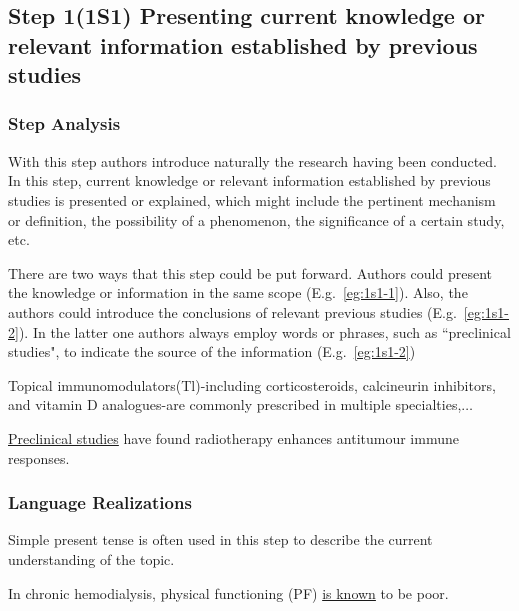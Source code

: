 \documentclass{ctexbook}
\begin{document}
  \subsection{Step 1(1S1) Presenting current knowledge or relevant information established by previous studies}

    \subsubsection{Step Analysis}

    With this step authors introduce naturally the research having been conducted. In this step, current knowledge or relevant information established by previous studies is presented or explained, which might include the pertinent mechanism or definition, the possibility of a phenomenon, the significance of a certain study, etc.
    
    There are two ways that this step could be put forward. Authors could present the knowledge or information in the same scope (E.g.~\ref{eg:1s1-1}). Also, the authors could introduce the conclusions of relevant previous studies (E.g.~\ref{eg:1s1-2}). In the latter one authors always employ words or phrases, such as “preclinical studies", to indicate the source of the information (E.g.~\ref{eg:1s1-2})
    
    \begin{eg}[label={eg:1s1-1}]{}
      Topical immunomodulators(Tl)-including corticosteroids, calcineurin inhibitors, and vitamin D analogues-are commonly prescribed in multiple specialties,$\dots$
    \end{eg}

    \begin{eg}[label={eg:1s1-2}]{}
      \uline{Preclinical studies} have found radiotherapy enhances antitumour immune responses.
    \end{eg}

    \subsubsection{Language Realizations}

    Simple present tense is often used in this step to describe the current understanding of the topic.

    \begin{eg}[label={myautocounter}]{}
      In chronic hemodialysis, physical functioning (PF) \uline{is known} to be poor.
    \end{eg}
\end{document}
